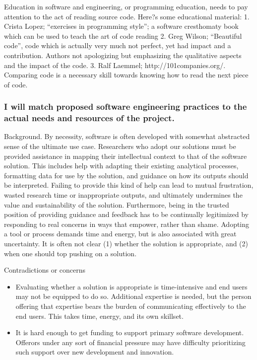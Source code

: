 \documentclass[a4paper,UKenglish]{dagman}
\renewcommand{\paragraph}[1]{\subsubsection*{#1}\xspace}
\begin{document}
Education in software and engineering, or programming education, needs to pay attention to the act of reading source code. Here?s some educational material:
1.	Crista Lopez; ``exercises in programming style''; a software cresthomaty book which can be used to teach the art of code reading
2.	Greg Wilson; ``Beautiful code'', code which is actually very much not perfect, yet had impact and a contribution. Authors not apologizing but emphasizing the qualitative aspects and the impact of the code.
3.	Ralf Laemmel; http://101companies.org/. Comparing code is a necessary skill towards knowing how to read the next piece of code.


\paragraph{I will match proposed software engineering practices to the actual needs and resources of the project.}


Background. By necessity, software is often developed with somewhat abstracted sense of the ultimate use case. Researchers who adopt our solutions must be provided assistance in mapping their intellectual context to that of the software solution. This includes help with adapting their existing analytical processes, formatting data for use by the solution, and guidance on how its outputs should be interpreted. Failing to provide this kind of help can lead to mutual frustration, wasted research time or inappropriate outputs, and ultimately undermines the value and sustainability of the solution. Furthermore, being in the trusted position of providing guidance and feedback has to be continually legitimized by responding to real concerns in ways that empower, rather than shame. Adopting a tool or process demands time and energy, but is also associated with great uncertainty. It is often not clear (1) whether the solution is appropriate, and (2) when one should top pushing on a solution.

Contradictions or concerns
\begin{itemize}
\item Evaluating whether a solution is appropriate is time-intensive and end users may not be equipped to do so. Additional expertise is needed, but the person offering that expertise bears the burden of communicating effectively to the end users. This takes time, energy, and its own skillset.
\item It is hard enough to get funding to support primary software development. Offerors under any sort of financial pressure may have difficulty prioritizing such support over new development and innovation. 
\end{itemize}
\end{document}
